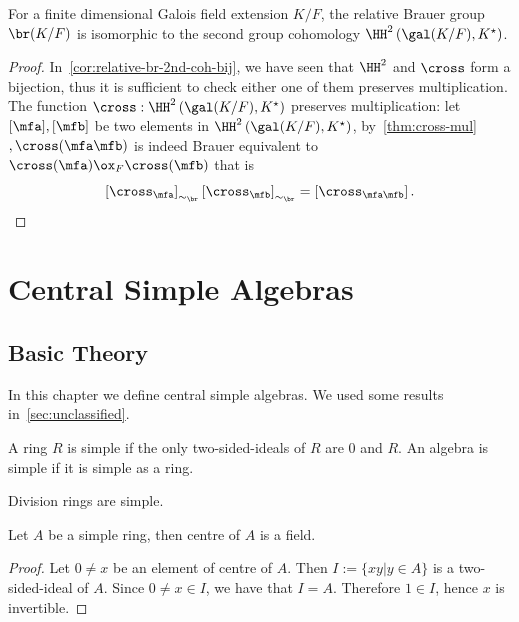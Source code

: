 \begin{corollary}
  For a finite dimensional Galois field extension $K/F$, the relative Brauer group $\br(K/F)$ is isomorphic to the second group cohomology $\HH^{2}\left(\gal(K/F),K^{\star}\right)$.
  \leanok
\end{corollary}
\begin{proof}
  In~\cref{cor:relative-br-2nd-coh-bij}, we have seen that $\HH^{2}$ and $\cross$ form a bijection, thus it is sufficient to check either one of them preserves multiplication. The function $\cross: \HH^{2}\left(\gal(K/F), K^{\star}\right)$ preserves multiplication: let $[\mfa], [\mfb]$ be two elements in $\HH^{2}\left(\gal(K/F), K^{\star}\right)$, by~\cref{thm:cross-mul}$, \cross(\mfa\mfb)$ is indeed Brauer equivalent to $\cross(\mfa)\ox_{F}\cross(\mfb)$ that is
  \[
    \left[\cross_{\mfa}\right]_{\sim_{\br}}\left[\cross_{\mfb}\right]_{\sim_{\br}} = \left[\cross_{\mfa\mfb}\right].
  \]
\end{proof}





\chapter{Central Simple Algebras}\label{sec:csa}

\section{Basic Theory}

In this chapter we define central simple algebras. We used some results
in~\cref{sec:unclassified}.

\begin{definition} A ring $R$ is simple if the only
  two-sided-ideals of $R$ are ${0}$ and $R$. An algebra is simple if it is
  simple as a ring.
  \leanok
\end{definition}

\begin{remark}
  Division rings are simple.
\end{remark}

\begin{lemma}
  \label{lem:center-simple-ring}
  Let $A$ be a simple ring, then centre of $A$ is a field. \leanok
\end{lemma}
\begin{proof}
  Let $0\ne x$ be an element of centre of $A$. Then $I := \{xy | y\in A\}$ is a
  two-sided-ideal of $A$. Since $0\ne x\in I$, we have that $I = A$. Therefore
  $1 \in I$, hence $x$ is invertible.
\end{proof}

